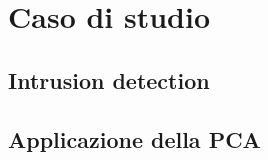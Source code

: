 \chapter{Caso di studio}
	
	\lipsum
	
	\section{Intrusion detection}
	
		\lipsum
		
	\section{Applicazione della PCA}
	
		\lipsum
		